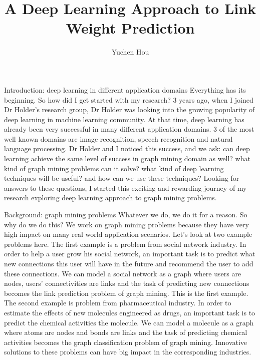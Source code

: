 \documentclass{beamer}
\title{A Deep Learning Approach to Link Weight Prediction}
\author{Yuchen Hou}
\date{}
\begin{document}

\begin{frame}{Introduction: deep learning in different application domains}
Everything has its beginning. So how did I get started with my research? 3 years ago, when I joined Dr Holder's research group, Dr Holder was looking into the growing popularity of deep learning in machine learning community. At that time, deep learning has already been very successful in many different application domains. 3 of the most well known domains are image recognition, speech recognition and natural language processing. Dr Holder and I noticed this success, and we ask: can deep learning achieve the same level of success in graph mining domain as well? what kind of graph mining problems can it solve? what kind of deep learning techniques will be useful? and how can we use these techniques? Looking for answers to these questions, I started this exciting and rewarding journey of my research exploring deep learning approach to graph mining problems.
\end{frame}

\begin{frame}{Background: graph mining problems}
Whatever we do, we do it for a reason. So why do we do this? We work on graph mining problems because they have very high impact on many real world application scenarios. Let's look at two example problems here. The first example is a problem from social network industry. In order to help a user grow his social network, an important task is to predict what new connections this user will have in the future and recommend the user to add these connections. We can model a social network as a graph where users are nodes, users' connectivities are links and the task of predicting new connections becomes the link prediction problem of graph mining. This is the first example. The second example is problem from pharmaceutical industry. In order to estimate the effects of new molecules engineered as drugs, an important task is to predict the chemical activities the molecule. We can model a molecule as a graph where atoms are nodes and bonds are links and the task of predicting chemical activities becomes the graph classification problem of graph mining. Innovative solutions to these problems can have big impact in the corresponding industries.
\end{frame}
\end{document}
